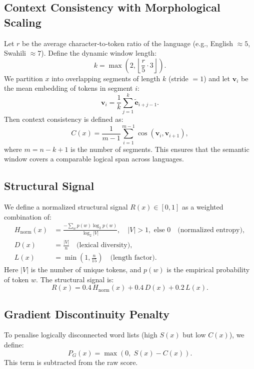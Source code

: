 \documentclass[11pt]{article}
\theoremstyle{definition}
\begin{document}
\subsection{Context Consistency with Morphological Scaling}
Let $r$ be the average character‑to‑token ratio of the language (e.g., English $\approx 5$, Swahili $\approx 7$). Define the dynamic window length:
\[
k = \max\left(2, \left\lfloor \frac{r}{5} \cdot 3 \right\rfloor\right).
\]
We partition $x$ into overlapping segments of length $k$ (stride $=1$) and let $\mathbf{v}_i$ be the mean embedding of tokens in segment $i$:
\[
\mathbf{v}_i = \frac{1}{k} \sum_{j=1}^{k} \tilde{\mathbf{e}}_{i+j-1}.
\]
Then context consistency is defined as:
\begin{equation}
C(x) = \frac{1}{m-1} \sum_{i=1}^{m-1} \cos(\mathbf{v}_i, \mathbf{v}_{i+1}),
\end{equation}
where $m = n - k + 1$ is the number of segments. This ensures that the semantic window covers a comparable logical span across languages.

\subsection{Structural Signal}
We define a normalized structural signal $R(x) \in [0,1]$ as a weighted combination of:
\begin{align}
H_{\text{norm}}(x) &= \frac{-\sum_{w} p(w)\log_2 p(w)}{\log_2 |V|}, \quad |V|>1, \text{ else } 0 \quad \text{(normalized entropy)}, \\
D(x) &= \frac{|V|}{n} \quad \text{(lexical diversity)}, \\
L(x) &= \min\left(1, \frac{n}{15}\right) \quad \text{(length factor)}.
\end{align}
Here $|V|$ is the number of unique tokens, and $p(w)$ is the empirical probability of token $w$. The structural signal is:
\begin{equation}
R(x) = 0.4 \, H_{\text{norm}}(x) + 0.4 \, D(x) + 0.2 \, L(x).
\end{equation}

\subsection{Gradient Discontinuity Penalty}
To penalise logically disconnected word lists (high $S(x)$ but low $C(x)$), we define:
\begin{equation}
P_G(x) = \max\left(0,\; S(x) - C(x)\right).
\end{equation}
This term is subtracted from the raw score.
\end{document}
